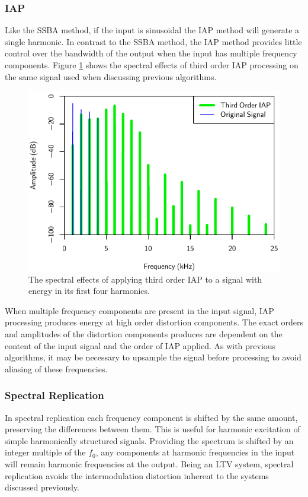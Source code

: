 		\subsubsection*{IAP}
			Like the SSBA method, if the input is sinusoidal the IAP method will generate a single harmonic. In
			contrast to the SSBA method, the IAP method provides little control over the bandwidth of the
			output when the input has multiple frequency components. Figure \ref{fig:IAP3Spectra} shows the
			spectral effects of third order IAP processing on the same signal used when discussing previous
			algorithms.

			\begin{figure}[h!]
				\centering
				\includegraphics{chapter5/Images/IAP3Spectra.pdf}
				\caption{The spectral effects of applying third order IAP to a signal with energy in its 
				         first four harmonics.}
				\label{fig:IAP3Spectra}
			\end{figure}

			When multiple frequency components are present in the input signal, IAP processing produces energy
			at high order distortion components. The exact orders and amplitudes of the distortion components
			produces are dependent on the content of the input signal and the order of IAP applied. As with
			previous algorithms, it may be necessary to upsample the signal before processing to avoid aliasing
			of these frequencies.

		\subsubsection*{Spectral Replication}
			In spectral replication each frequency component is shifted by the same amount, preserving the
			differences between them. This is useful for harmonic excitation of simple harmonically structured
			signals. Providing the spectrum is shifted by an integer multiple of the $f_{0}$, any components at
			harmonic frequencies in the input will remain harmonic frequencies at the output. Being an LTV
			system, spectral replication avoids the intermodulation distortion inherent to the systems
			discussed previously. 

